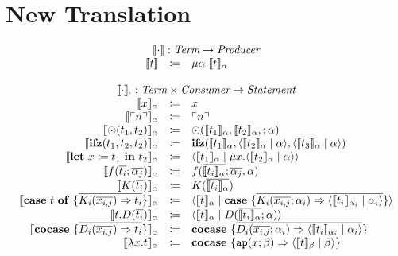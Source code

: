 \documentclass[nonacm]{acmart}
\newcommand{\translate}[1]{\ensuremath{\llbracket#1 \rrbracket}}
\newcommand{\lit}[1]{\ensuremath{\ulcorner #1\urcorner}}
\newcommand{\cut}[2]{\ensuremath{\langle #1 \mid #2 \rangle}}
\newcommand{\letin}[3]{\ensuremath{\mathbf{let}\ #1 \coloneqq #2\ \mathbf{in}\ #3}}
\newcommand{\caseof}[2]{\ensuremath{\mathbf{case}\ #1\ \mathbf{of}\ \{ #2 \}}}
\begin{document}
\section{New Translation}
\label{sec:new-translation}

\[
  \begin{array}{rcl}
    \multicolumn{3}{c}{\translate{\cdot} : \emph{Term} \rightarrow  \emph{Producer}}\\
    \translate{t} & \coloneqq & \mu \alpha. \translate{t}_{\alpha}\\
    \\
    \multicolumn{3}{c}{\translate{\cdot}_{\cdot} : \emph{Term}\times \emph{Consumer} \rightarrow \emph{Statement}}\\
    \translate{x}_{\alpha} & \coloneq & x\\
    \translate{\lit{n}}_{\alpha} & \coloneq & \lit{n}\\
    \translate{\odot(t_1,t_2)}_{\alpha} & \coloneq & \odot(\translate{t_1}_{\alpha},\translate{t_2}_{\alpha},;\alpha)\\
    \translate{\mathbf{ifz}(t_1,t_2,t_2)}_{\alpha} & \coloneq & \mathbf{ifz}(\translate{t_1}_{\alpha},\cut{\translate{t_2}_{\alpha}}{\alpha},\cut{\translate{t_3}_{\alpha}}{\alpha})\\
    \translate{\letin{x}{t_1}{t_2}}_{\alpha} & \coloneq & \cut{\translate{t_1}_{\alpha}}{\tilde{\mu}x.\cut{\translate{t_2}_{\alpha}}{\alpha}}\\
    \translate{f(\overline{t_i};\overline{\alpha_j})}_{\alpha} & \coloneq & f(\overline{\translate{t_i}_{\alpha}};\overline{\alpha_j},\alpha)\\
    \translate{K(\overline{t_i})}_{\alpha} & \coloneq & K(\overline{\translate{t_i}_{\alpha}})\\
    \translate{\caseof{t}{\overline{K_i(\overline{x_{i,j}})\Rightarrow t_i}}}_{\alpha} & \coloneq & \cut{\translate{t}_{\alpha}}{\mathbf{case}\ \{\overline{K_i(\overline{x_{i,j}};\alpha_i)\Rightarrow \cut{\translate{t_i}_{\alpha_i}}{\alpha_i}}\}}\\
    \translate{t.D(\overline{t_i})}_{\alpha} & \coloneq & \cut{\translate{t}_{\alpha}}{D(\overline{\translate{t_i}_{\alpha}};\alpha)}\\
    \translate{\mathbf{cocase}\ \{\overline{D_i(\overline{x_{i,j}}) \Rightarrow t_i}\}}_{\alpha} & \coloneq & \mathbf{cocase}\ \{\overline{D_i(\overline{x_{i,j}};\alpha_i) \Rightarrow \cut{\translate{t_i}_{\alpha_i}}{\alpha_i}}\}\\
    \translate{\lambda x.t}_{\alpha} & \coloneq & \mathbf{cocase}\ \{ \mathtt{ap}(x;\beta) \Rightarrow \cut{\translate{t}_{\beta}}{\beta} \} \\

\end{array}\]
\end{document}
